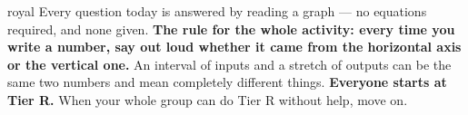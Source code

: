 \documentclass[10pt]{article}
\begin{document}

\vspace{0.15in}

\begin{scenariobox}{royal}
\small
Every question today is answered by reading a graph --- no equations required, and none given.
\textbf{The rule for the whole activity: every time you write a number, say out loud whether it came
from the horizontal axis or the vertical one.} An interval of inputs and a stretch of outputs can be
the same two numbers and mean completely different things. \textbf{Everyone starts at Tier R.} When
your whole group can do Tier R without help, move on.
\end{scenariobox}

\vspace{0.10in}
\end{document}
